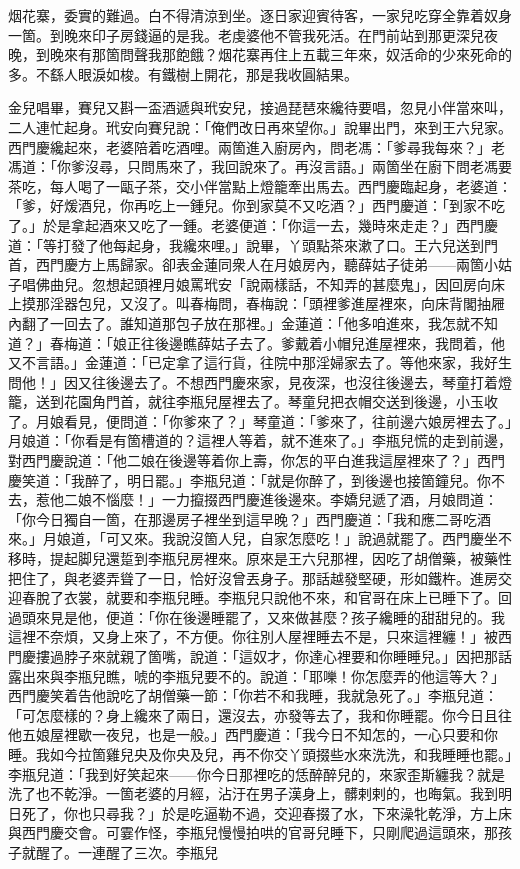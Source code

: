 \begin{myquote} 
烟花寨，委實的難過。白不得清涼到坐。逐日家迎賓待客，一家兒吃穿全靠着奴身一箇。到晚來印子房錢逼的是我。老虔婆他不管我死活。在門前站到那更深兒夜晚，到晚來有那箇問聲我那飽餓？烟花寨再住上五載三年來，奴活命的少來死命的多。不繇人眼淚如梭。有鐵樹上開花，那是我收圓結果。
\end{myquote} 

金兒唱畢，賽兒又斟一盃酒遞與玳安兒，接過琵琶來纔待要唱，忽見小伴當來叫，二人連忙起身。玳安向賽兒說：「俺們改日再來望你。」說畢出門，來到王六兒家。西門慶纔起來，老婆陪着吃酒哩。兩箇進入廚房內，問老馮：「爹尋我每來？」老馮道：「你爹沒尋，只問馬來了，我回說來了。再沒言語。」兩箇坐在廚下問老馮要茶吃，每人喝了一甌子茶，交小伴當點上燈籠牽出馬去。西門慶臨起身，老婆道：「爹，好煖酒兒，你再吃上一鍾兒。你到家莫不又吃酒？」西門慶道：「到家不吃了。」於是拿起酒來又吃了一鍾。老婆便道：「你這一去，幾時來走走？」西門慶道：「等打發了他每起身，我纔來哩。」說畢，丫頭點茶來漱了口。王六兒送到門首，西門慶方上馬歸家。卻表金蓮同衆人在月娘房內，聽薛姑子徒弟——兩箇小姑子唱佛曲兒。忽想起頭裡月娘罵玳安「說兩樣話，不知弄的甚麼鬼」，因回房向床上摸那淫器包兒，又沒了。叫春梅問，春梅說：「頭裡爹進屋裡來，向床背閣抽屜內翻了一回去了。誰知道那包子放在那裡。」金蓮道：「他多咱進來，我怎就不知道？」春梅道：「娘正往後邊瞧薛姑子去了。爹戴着小帽兒進屋裡來，我問着，他又不言語。」金蓮道：「已定拿了這行貨，往院中那淫婦家去了。等他來家，我好生問他！」因又往後邊去了。不想西門慶來家，見夜深，也沒往後邊去，琴童打着燈籠，送到花園角門首，就往李瓶兒屋裡去了。琴童兒把衣帽交送到後邊，小玉收了。月娘看見，便問道：「你爹來了？」琴童道：「爹來了，往前邊六娘房裡去了。」月娘道：「你看是有箇槽道的？這裡人等着，就不進來了。」李瓶兒慌的走到前邊，對西門慶說道：「他二娘在後邊等着你上壽，你怎的平白進我這屋裡來了？」西門慶笑道：「我醉了，明日罷。」李瓶兒道：「就是你醉了，到後邊也接箇鐘兒。你不去，惹他二娘不惱麼！」一力攛掇西門慶進後邊來。李嬌兒遞了酒，月娘問道：「你今日獨自一箇，在那邊房子裡坐到這早晚？」西門慶道：「我和應二哥吃酒來。」月娘道，「可又來。我說沒箇人兒，自家怎麼吃！」說過就罷了。西門慶坐不移時，提起脚兒還踅到李瓶兒房裡來。原來是王六兒那裡，因吃了胡僧藥，被藥性把住了，與老婆弄聳了一日，恰好沒曾丟身子。那話越發堅硬，形如鐵杵。進房交迎春脫了衣裳，就要和李瓶兒睡。李瓶兒只說他不來，和官哥在床上已睡下了。回過頭來見是他，便道：「你在後邊睡罷了，又來做甚麼？孩子纔睡的甜甜兒的。我這裡不奈煩，又身上來了，不方便。你往別人屋裡睡去不是，只來這裡纏！」被西門慶摟過脖子來就親了箇嘴，說道：「這奴才，你達心裡要和你睡睡兒。」因把那話露出來與李瓶兒瞧，唬的李瓶兒要不的。說道：「耶嚛！你怎麼弄的他這等大？」西門慶笑着告他說吃了胡僧藥一節：「你若不和我睡，我就急死了。」李瓶兒道：「可怎麼樣的？身上纔來了兩日，還沒去，亦發等去了，我和你睡罷。你今日且往他五娘屋裡歇一夜兒，也是一般。」西門慶道：「我今日不知怎的，一心只要和你睡。我如今拉箇雞兒央及你央及兒，再不你交丫頭掇些水來洗洗，和我睡睡也罷。」李瓶兒道：「我到好笑起來——你今日那裡吃的恁醉醉兒的，來家歪斯纏我？就是洗了也不乾淨。一箇老婆的月經，沾汙在男子漢身上，髒剌剌的，也晦氣。我到明日死了，你也只尋我？」於是吃逼勒不過，交迎春掇了水，下來澡牝乾淨，方上床與西門慶交會。可霎作怪，李瓶兒慢慢拍哄的官哥兒睡下，只剛爬過這頭來，那孩子就醒了。一連醒了三次。李瓶兒
